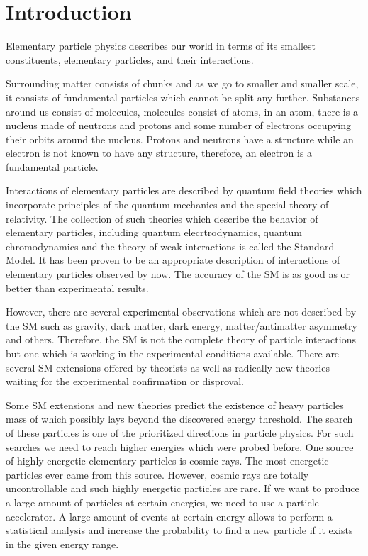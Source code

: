 \section{Introduction}
\label{sec:intro}


Elementary particle physics describes our world in terms of its smallest constituents, elementary particles, and their interactions. 

Surrounding matter consists of chunks and as we go to smaller and smaller scale, it consists of fundamental particles which cannot be split any further. Substances around us consist of molecules, molecules consist of atoms, in an atom, there is a nucleus made of neutrons and protons and some number of electrons occupying their orbits around the nucleus. Protons and neutrons have a structure while an electron is not known to have any structure, therefore, an electron is a fundamental particle.

Interactions of elementary particles are described by quantum field theories which incorporate principles of the quantum mechanics and the special theory of relativity. The collection of such theories which describe the behavior of elementary particles, including quantum elecrtrodynamics, quantum chromodynamics and the theory of weak interactions is called the Standard Model. It has been proven to be an appropriate description of interactions of elementary particles observed by now. The accuracy of the SM is as good as or better than experimental results.

However, there are several experimental observations which are not described by the SM such as gravity, dark matter, dark energy, matter/antimatter asymmetry and others. Therefore, the SM is not the complete theory of particle interactions but one which is working in the experimental conditions available. There are several SM extensions offered by theorists as well as radically new theories waiting for the experimental confirmation or disproval. 

Some SM extensions and new theories predict the existence of heavy particles mass of which possibly lays beyond the discovered energy threshold. The search of these particles is one of the prioritized directions in particle physics. For such searches we need to reach higher energies which were probed before. One source of highly energetic elementary particles is cosmic rays. The most energetic particles ever came from this source. However, cosmic rays are totally uncontrollable and such highly energetic particles are rare. If we want to produce a large amount of particles at certain energies, we need to use a particle accelerator. A large amount of events at certain energy allows to perform a statistical analysis and increase the probability to find a new particle if it exists in the given energy range.


